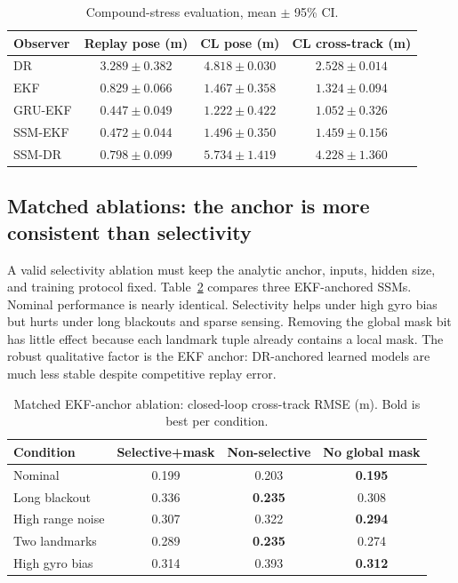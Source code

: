 \documentclass{article}
\newcommand{\obs}[1]{\textsc{#1}}
\begin{document}
\begin{table}[t]
\centering
\caption{Compound-stress evaluation, mean $\pm$ 95\% CI.}
\label{tab:compound}
\small
\begin{tabular}{lccc}
\toprule
Observer & Replay pose (m) & CL pose (m) & CL cross-track (m)\\
\midrule
\obs{DR} & $3.289\pm0.382$ & $4.818\pm0.030$ & $2.528\pm0.014$\\
\obs{EKF} & $0.829\pm0.066$ & $1.467\pm0.358$ & $1.324\pm0.094$\\
\obs{GRU-EKF} & $\mathbf{0.447\pm0.049}$ & $\mathbf{1.222\pm0.422}$ & $\mathbf{1.052\pm0.326}$\\
\obs{SSM-EKF} & $0.472\pm0.044$ & $1.496\pm0.350$ & $1.459\pm0.156$\\
\obs{SSM-DR} & $0.798\pm0.099$ & $5.734\pm1.419$ & $4.228\pm1.360$\\
\bottomrule
\end{tabular}
\end{table}

\subsection{Matched ablations: the anchor is more consistent than selectivity}
A valid selectivity ablation must keep the analytic anchor, inputs, hidden size, and training protocol fixed. Table~\ref{tab:ablation} compares three EKF-anchored SSMs. Nominal performance is nearly identical. Selectivity helps under high gyro bias but hurts under long blackouts and sparse sensing. Removing the global mask bit has little effect because each landmark tuple already contains a local mask. The robust qualitative factor is the EKF anchor: DR-anchored learned models are much less stable despite competitive replay error.

\begin{table}[t]
\centering
\caption{Matched EKF-anchor ablation: closed-loop cross-track RMSE (m). Bold is best per condition.}
\label{tab:ablation}
\small
\begin{tabular}{lccc}
\toprule
Condition & Selective+mask & Non-selective & No global mask\\
\midrule
Nominal & 0.199 & 0.203 & \textbf{0.195}\\
Long blackout & 0.336 & \textbf{0.235} & 0.308\\
High range noise & 0.307 & 0.322 & \textbf{0.294}\\
Two landmarks & 0.289 & \textbf{0.235} & 0.274\\
High gyro bias & 0.314 & 0.393 & \textbf{0.312}\\
\bottomrule
\end{tabular}
\end{table}
\end{document}
